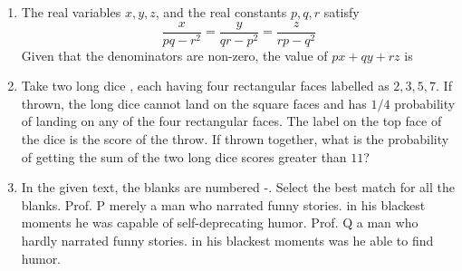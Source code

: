 \documentclass[journal]{IEEEtran}
\begin{document}
\begin{enumerate}[leftmargin=0pt]
\hfill{}

\vspace{4mm}

\item
The real variables $x,y,z$, and the real constants $p,q,r$ satisfy 
\[
\frac{x}{pq - r^2} =
\frac{y}{qr - p^2} =
\frac{z}{rp - q^2}
\]
Given that the denominators are non-zero, the value of $px + qy + rz$ is 

\vspace{2mm}

\begin{enumerate}
\end{enumerate}

\hfill{}

\vspace{4mm}

\item
Take two long dice , each having four rectangular faces labelled as $2, 3, 5, 7$. If thrown, the long dice cannot land on the square faces and has $1/4$ probability of landing on any of the four rectangular faces. The label on the top face of the dice is the score of the throw. If thrown together, what is the probability of getting the sum of the two long dice scores greater than $11$?

\vspace{2mm}

\begin{enumerate}
\end{enumerate}

\hfill{}


\item
In the given text, the blanks are numbered -. Select the best match for all the blanks.  
Prof. P  merely a man who narrated funny stories.  in his blackest moments he was capable of self-deprecating humor.  
Prof. Q  a man who hardly narrated funny stories.  in his blackest moments was he able to find humor.  


\end{enumerate}
\end{document}
